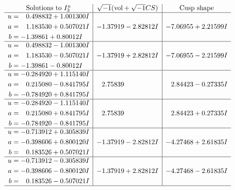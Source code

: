 \documentclass[1p]{elsarticle_modified}
\theoremstyle{definition}
\newcommand{\I}{\sqrt{-1}}
\begin{document}
$$\begin{array}{c|c|c}  
\text{Solutions to }I^u_{3}& \I (\text{vol} + \sqrt{-1}CS) & \text{Cusp shape}\\
 \hline 
\begin{aligned}
u &= \phantom{-}0.498832 + 1.001300 I \\
a &= \phantom{-}1.183530 + 0.507021 I \\
b &= -1.39861 + 0.80012 I\end{aligned}
 & -1.37919 - 2.82812 I & -7.06955 + 2.21599 I \\ \hline\begin{aligned}
u &= \phantom{-}0.498832 - 1.001300 I \\
a &= \phantom{-}1.183530 - 0.507021 I \\
b &= -1.39861 - 0.80012 I\end{aligned}
 & -1.37919 + 2.82812 I & -7.06955 - 2.21599 I \\ \hline\begin{aligned}
u &= -0.284920 + 1.115140 I \\
a &= \phantom{-}0.215080 - 0.841795 I \\
b &= -0.784920 + 0.841795 I\end{aligned}
 & \phantom{-}2.75839\phantom{ +0.000000I} & \phantom{-}2.84423 - 0.27335 I \\ \hline\begin{aligned}
u &= -0.284920 - 1.115140 I \\
a &= \phantom{-}0.215080 + 0.841795 I \\
b &= -0.784920 - 0.841795 I\end{aligned}
 & \phantom{-}2.75839\phantom{ +0.000000I} & \phantom{-}2.84423 + 0.27335 I \\ \hline\begin{aligned}
u &= -0.713912 + 0.305839 I \\
a &= -0.398606 + 0.800120 I \\
b &= \phantom{-}0.183526 + 0.507021 I\end{aligned}
 & -1.37919 - 2.82812 I & -4.27468 + 2.61835 I \\ \hline\begin{aligned}
u &= -0.713912 - 0.305839 I \\
a &= -0.398606 - 0.800120 I \\
b &= \phantom{-}0.183526 - 0.507021 I\end{aligned}
 & -1.37919 + 2.82812 I & -4.27468 - 2.61835 I\\
 \hline 
 \end{array}$$\newpage
\end{document}
